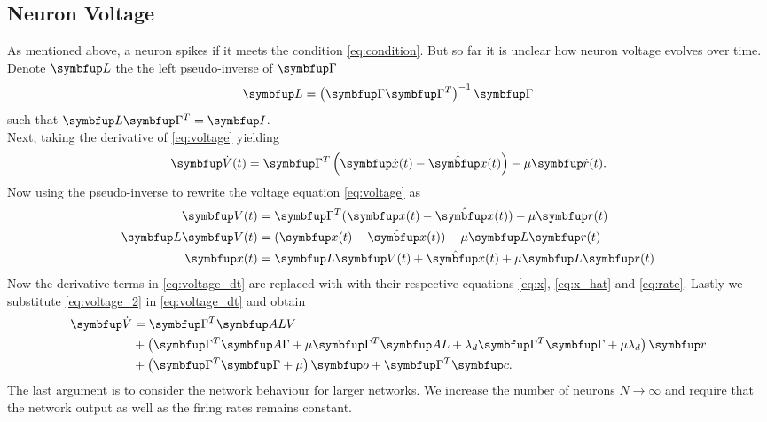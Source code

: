 \subsection{Neuron Voltage}
As mentioned above, a neuron spikes if it meets the condition \cref{eq:condition}. But so far it is unclear how neuron voltage evolves over time.
Denote $\bmu{L}$ the the left pseudo-inverse of $\bmu{\Gamma}$ \begin{equation}
\bmu{L} = \left(\bmu{\Gamma}\bmu{\Gamma}^T\right)^{-1}\bmu{\Gamma}
\end{equation}
such that $\bmu{L}\bmu{\Gamma}^T = \bmu{I}$.\\
Next, taking the derivative of \cref{eq:voltage} yielding
\begin{equation}\label{eq:voltage_dt}
\bmu{\dot{V}}(t)=\bmu{\Gamma}^T\left(\bmu{\dot{x}}(t)-\dot{\hat{\bmu{x}}}(t)\right)-\mu \bmu{\dot{r}}(t).
\end{equation}
Now using the pseudo-inverse to rewrite the voltage equation \cref{eq:voltage} as
\begin{equation}\label{eq:voltage_2}
\begin{aligned}
\bmu{V}(t)&=\bmu{\Gamma}^T(\bmu{x}(t)-\hat{\bmu{x}}(t))-\mu \bmu{r}(t)\\
\bmu{L}\bmu{V}(t)&=(\bmu{x}(t)-\hat{\bmu{x}}(t))-\mu \bmu{L}\bmu{r}(t)\\
\bmu{x}(t)&=\bmu{L}\bmu{V}(t)  + \hat{\bmu{x}}(t) + \mu \bmu{L}\bmu{r}(t)\\
\end{aligned}
\end{equation}
Now the derivative terms in \cref{eq:voltage_dt} are replaced with  with their respective equations \cref{eq:x}, \cref{eq:x_hat} and \cref{eq:rate}. Lastly we substitute \cref{eq:voltage_2} in \cref{eq:voltage_dt} and obtain
\begin{equation}\label{eq:voltage_limit}
\begin{aligned}
	\bmu{\dot{V}} &= \bmu{\Gamma}^T\bmu{ALV}\\
	 &+ \left(\bmu{\Gamma}^T\bmu{A\Gamma} + \mu\bmu{\Gamma}^T \bmu{AL}+\lambda_d\bmu{\Gamma}^T\bmu{\Gamma + \mu\lambda_d}\right)\bmu{r}\\
	 &+\left(\bmu{\Gamma}^T\bmu{\Gamma} + \mu\right)\bmu{o} + \bmu{\Gamma}^T\bmu{c}.
\end{aligned}
\end{equation}
The last argument is to consider the network behaviour for larger networks. We increase the number of neurons $N\longrightarrow\infty$ and require that the network output as well as the firing rates remains constant.\\
